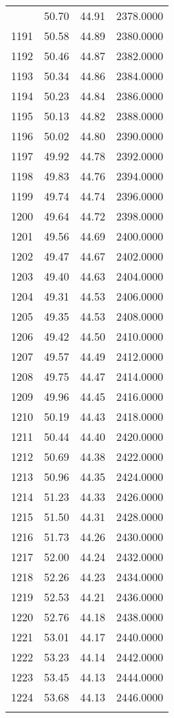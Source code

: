\documentclass[
  captions=tableheading,
]{scrartcl}
\begin{document}
\begin{longtable} {l|l|l|l}
{1190 &	50.70 &	44.91 &	2378.0000\\
1191 &	50.58 &	44.89 &	2380.0000\\
1192 &	50.46 &	44.87 &	2382.0000\\
1193 &	50.34 &	44.86 &	2384.0000\\
1194 &	50.23 &	44.84 &	2386.0000\\
1195 &	50.13 &	44.82 &	2388.0000\\
1196 &	50.02 &	44.80 &	2390.0000\\
1197 &	49.92 &	44.78 &	2392.0000\\
1198 &	49.83 &	44.76 &	2394.0000\\
1199 &	49.74 &	44.74 &	2396.0000\\
1200 &	49.64 &	44.72 &	2398.0000\\
1201 &	49.56 &	44.69 &	2400.0000\\
1202 &	49.47 &	44.67 &	2402.0000\\
1203 &	49.40 &	44.63 &	2404.0000\\
1204 &	49.31 &	44.53 &	2406.0000\\
1205 &	49.35 &	44.53 &	2408.0000\\
1206 &	49.42 &	44.50 &	2410.0000\\
1207 &	49.57 &	44.49 &	2412.0000\\
1208 &	49.75 &	44.47 &	2414.0000\\
1209 &	49.96 &	44.45 &	2416.0000\\
1210 &	50.19 &	44.43 &	2418.0000\\
1211 &	50.44 &	44.40 &	2420.0000\\
1212 &	50.69 &	44.38 &	2422.0000\\
1213 &	50.96 &	44.35 &	2424.0000\\
1214 &	51.23 &	44.33 &	2426.0000\\
1215 &	51.50 &	44.31 &	2428.0000\\
1216 &	51.73 &	44.26 &	2430.0000\\
1217 &	52.00 &	44.24 &	2432.0000\\
1218 &	52.26 &	44.23 &	2434.0000\\
1219 &	52.53 &	44.21 &	2436.0000\\
1220 &	52.76 &	44.18 &	2438.0000\\
1221 &	53.01 &	44.17 &	2440.0000\\
1222 &	53.23 &	44.14 &	2442.0000\\
1223 &	53.45 &	44.13 &	2444.0000\\
1224 &	53.68 &	44.13 &	2446.0000\\
}
\end{longtable}
\end{document}
